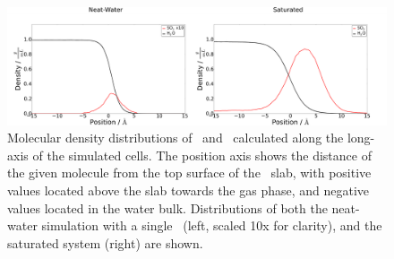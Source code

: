 \begin{figure}[h!]
	\begin{center}
		\includegraphics[scale=1.0]{images/density/density.png}
		\caption{Molecular density distributions of \wat~and \suldiox~calculated along the long-axis of the simulated cells. The position axis shows the distance of the given molecule from the top surface of the \wat~slab, with positive values located above the slab towards the gas phase, and negative values located in the water bulk. Distributions of both the neat-water simulation with a single \suldiox~(left, scaled 10x for clarity), and the saturated system (right) are shown.}
		\label{fig:density}
	\end{center}
\end{figure}
